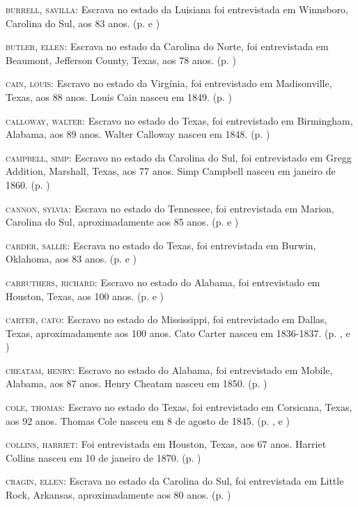 \begin{Parskip}
\textsc{burrell, savilla:} Escrava no estado da Luisiana foi
entrevistada em Winnsboro, Carolina do Sul, aos 83 anos. (p. \pageref{ref39} e \pageref{ref40})

\textsc{butler, ellen:} Escrava no estado da Carolina do Norte, foi
entrevistada em Beaumont, Jefferson County, Texas, aos 78 anos. (p. \pageref{ref41})

\textsc{cain, louis:} Escravo no estado da Virgínia, foi entrevistado em
Madisonville, Texas, aos 88 anos. Louis Cain nasceu em 1849. (p. \pageref{ref42})

\textsc{calloway, walter:} Escravo no estado do Texas, foi entrevistado
em Birmingham, Alabama, aos 89 anos. Walter Calloway nasceu em 1848. (p. \pageref{ref43})

\textsc{campbell, simp:} Escravo no estado da Carolina do Sul, foi
entrevistado em Gregg Addition, Marshall, Texas, aos 77 anos. Simp
Campbell nasceu em janeiro de 1860. (p. \pageref{ref44})

\textsc{cannon, sylvia:} Escrava no estado do Tennessee, foi
entrevistada em Marion, Carolina do Sul, aproximadamente aos 85 anos. (p. \pageref{ref45} e \pageref{ref46})

\textsc{carder, sallie:} Escrava no estado do Texas, foi entrevistada em
Burwin, Oklahoma, aos 83 anos. (p. \pageref{ref47} e \pageref{ref48}) 

\textsc{carruthers, richard:} Escravo no estado do Alabama, foi
entrevistado em Houston, Texas, aos 100 anos. (p. \pageref{ref49} e \pageref{ref50}) 

\textsc{carter, cato:} Escravo no estado do Mississippi, foi
entrevistado em Dallas, Texas, aproximadamente aos 100 anos. Cato Carter
nasceu em 1836-1837. (p. \pageref{ref51}, \pageref{ref52} e \pageref{ref53}) 

\textsc{cheatam, henry:} Escravo no estado do Alabama, foi entrevistado
em Mobile, Alabama, aos 87 anos. Henry Cheatam nasceu em 1850. (p. \pageref{ref54})

\textsc{cole, thomas:} Escravo no estado do Texas, foi entrevistado em
Corsicana, Texas, aos 92 anos. Thomas Cole nasceu em 8 de agosto de
1845. (p. \pageref{ref55}, \pageref{ref56} e \pageref{ref57})

\textsc{collins, harriet:} Foi entrevistada em Houston, Texas, aos 67
anos. Harriet Collins nasceu em 10 de janeiro de 1870. (p. \pageref{ref58})

\textsc{cragin, ellen:} Escrava no estado da Carolina do Sul, foi
entrevistada em Little Rock, Arkansas, aproximadamente aos 80 anos. (p. \pageref{ref59})


\end{Parskip}
